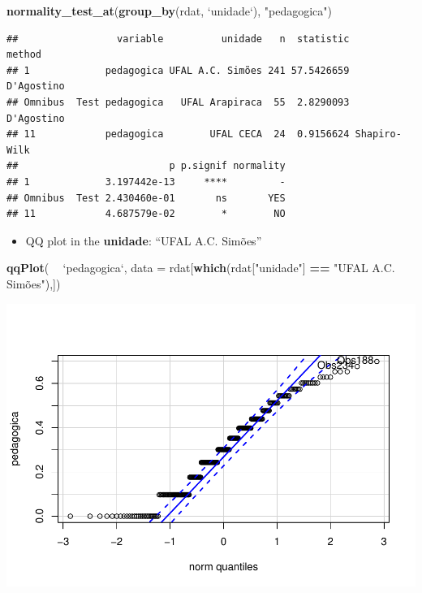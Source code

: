 \documentclass[]{article}
\newenvironment{Shaded}{\begin{snugshade}}{\end{snugshade}}
\newcommand{\DataTypeTok}[1]{\textcolor[rgb]{0.13,0.29,0.53}{#1}}
\newcommand{\KeywordTok}[1]{\textcolor[rgb]{0.13,0.29,0.53}{\textbf{#1}}}
\newcommand{\NormalTok}[1]{#1}
\newcommand{\OperatorTok}[1]{\textcolor[rgb]{0.81,0.36,0.00}{\textbf{#1}}}
\newcommand{\StringTok}[1]{\textcolor[rgb]{0.31,0.60,0.02}{#1}}
\providecommand{\tightlist}{%
  \setlength{\itemsep}{0pt}\setlength{\parskip}{0pt}}
\begin{document}
\begin{Shaded}
\begin{Highlighting}[]
\KeywordTok{normality_test_at}\NormalTok{(}\KeywordTok{group_by}\NormalTok{(rdat, }\StringTok{`}\DataTypeTok{unidade}\StringTok{`}\NormalTok{), }\StringTok{"pedagogica"}\NormalTok{)}
\end{Highlighting}
\end{Shaded}

\begin{verbatim}
##                 variable          unidade   n  statistic       method
## 1             pedagogica UFAL A.C. Simões 241 57.5426659   D'Agostino
## Omnibus  Test pedagogica   UFAL Arapiraca  55  2.8290093   D'Agostino
## 11            pedagogica        UFAL CECA  24  0.9156624 Shapiro-Wilk
##                          p p.signif normality
## 1             3.197442e-13     ****         -
## Omnibus  Test 2.430460e-01       ns       YES
## 11            4.687579e-02        *        NO
\end{verbatim}

\begin{itemize}
\tightlist
\item
  QQ plot in the \textbf{unidade}: ``UFAL A.C. Simões''
\end{itemize}

\begin{Shaded}
\begin{Highlighting}[]
\KeywordTok{qqPlot}\NormalTok{( }\OperatorTok{~}\StringTok{ `}\DataTypeTok{pedagogica}\StringTok{`}\NormalTok{, }\DataTypeTok{data =}\NormalTok{ rdat[}\KeywordTok{which}\NormalTok{(rdat[}\StringTok{"unidade"}\NormalTok{] }\OperatorTok{==}\StringTok{ "UFAL A.C. Simões"),])}
\end{Highlighting}
\end{Shaded}

\includegraphics{factorialAnova_files/figure-latex/unnamed-chunk-12-1.pdf}
\end{document}
